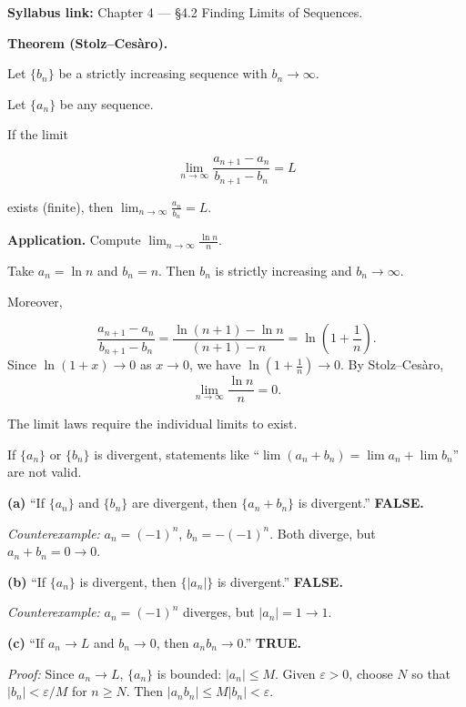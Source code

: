 \begin{extension}[title={Extension (Beyond Syllabus: Stolz--Ces\`aro theorem for limits)}]

\textbf{Syllabus link:} Chapter 4 --- \S4.2 Finding Limits of Sequences.

\medskip

\textbf{Theorem (Stolz--Ces\`aro).}

Let $\{b_n\}$ be a strictly increasing sequence with $b_n\to\infty$.

Let $\{a_n\}$ be any sequence.

If the limit

\[
\lim_{n\to\infty}\frac{a_{n+1}-a_n}{b_{n+1}-b_n}=L
\]

exists (finite), then $\displaystyle \lim_{n\to\infty}\frac{a_n}{b_n}=L$.

\medskip

\textbf{Application.} Compute $\displaystyle \lim_{n\to\infty}\frac{\ln n}{n}$.

Take $a_n=\ln n$ and $b_n=n$. Then $b_n$ is strictly increasing and $b_n\to\infty$.

Moreover,

\[
\frac{a_{n+1}-a_n}{b_{n+1}-b_n}
=\frac{\ln(n+1)-\ln n}{(n+1)-n}
=\ln\!\left(1+\frac{1}{n}\right).
\]
Since $\ln(1+x)\to 0$ as $x\to 0$, we have $\ln\!\left(1+\frac{1}{n}\right)\to 0$.
By Stolz--Ces\`aro,
\[
\boxed{\lim_{n\to\infty}\frac{\ln n}{n}=0.}
\]

\end{extension}

\begin{commonmistake}

The limit laws require the individual limits to exist.

If $\{a_n\}$ or $\{b_n\}$ is divergent, statements like ``$\lim(a_n+b_n)=\lim a_n+\lim b_n$'' are not valid.

\end{commonmistake}

\begin{examplebox}[title={Worked Example (Tutorial 7, Q4): True/false on divergent sequences}]

\textbf{(a)} ``If $\{a_n\}$ and $\{b_n\}$ are divergent, then $\{a_n+b_n\}$ is divergent.'' \textbf{FALSE.}

\emph{Counterexample:} $a_n=(-1)^n$, $b_n=-(-1)^n$. Both diverge, but $a_n+b_n=0\to 0$.

\textbf{(b)} ``If $\{a_n\}$ is divergent, then $\{|a_n|\}$ is divergent.'' \textbf{FALSE.}

\emph{Counterexample:} $a_n=(-1)^n$ diverges, but $|a_n|=1\to 1$.

\textbf{(c)} ``If $a_n\to L$ and $b_n\to 0$, then $a_nb_n\to 0$.'' \textbf{TRUE.}

\emph{Proof:} Since $a_n\to L$, $\{a_n\}$ is bounded: $|a_n|\le M$. Given $\varepsilon>0$, choose $N$ so that $|b_n|<\varepsilon/M$ for $n\ge N$. Then $|a_nb_n|\le M|b_n|<\varepsilon$.

\end{examplebox}

